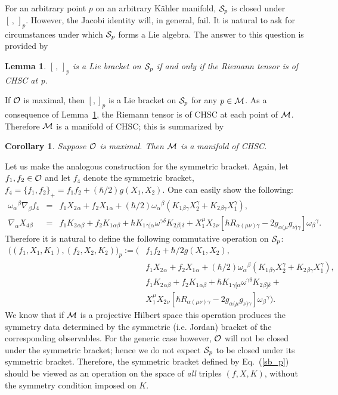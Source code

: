 \documentclass[12pt,aps,eqsecnum,tighten,nofootinbib]{revtex4-2}
\newtheorem{lemma}{Lemma}[section]
\def\be{\begin{equation}}
\def\ee{\end{equation}}
\def\ba{\begin{eqnarray}}
\def\ea{\end{eqnarray}}
\def\a{\alpha}
\def\b{\beta}
\def\c{\gamma}
\def\grad{\nabla}
\def\M{{\cal M}}
\def\w{\omega}
\newcommand{\eqn}[1]{Eq.~(\ref{#1})}
\newtheorem{cor}{Corollary}
\begin{document}
For an arbitrary point $p$ on an arbitrary K\"ahler manifold, ${\cal
S}_p$ is closed under $[\, ,\,]_p$.  However, the Jacobi identity
will, in general, fail.  It is natural to ask for circumstances under
which ${\cal S}_p$ forms a Lie algebra.  The answer to this question
is provided by
%
\begin{lemma} \label{lem_jacobi} 
$[\, ,\, ]_p$ is a Lie bracket on ${\cal S}_p$ if and only if the
Riemann tensor is of CHSC at p.
\end{lemma}
%
\noindent
If ${\cal O}$ is maximal, then $[ , ]_p$ is a Lie bracket on ${\cal
S}_p$ for any $p\in\M$.  As a consequence of Lemma~\ref{lem_jacobi},
the Riemann tensor is of CHSC at each point of $\M$.  Therefore $\M$
is a manifold of CHSC; this is summarized by
%
\begin{cor}\label{cor2}
Suppose ${\cal O}$ is maximal.  Then $\M$ is a manifold of CHSC.
\end{cor}
%

Let us make the analogous construction for the symmetric bracket.
Again, let $f_1, f_2 \in {\cal O}$ and let $f_4$ denote the symmetric
bracket, $f_4 = \{f_1, f_2 \}_+ = f_1 f_2 + (\hbar/2) g(X_1, X_2)$. 
One can easily show the following:
%
\ba
	\w_\a{}^\b \grad_\b f_4 &=&
	f_1 X_2{}_\a + f_2 X_1{}_\a + 
	(\hbar/2) \w_\a{}^\b\left(
	K_1{}_{\b\c} X_2^\c + K_2{}_{\b\c} X_1^\c \right),\\
%
	\grad_\a X_4{}_\b &=& 
	f_1 K_2{}_{\a\b} + f_2 K_1{}_{\a\b} +
	\hbar K_1{}_{\c[\a} \w^{\c\delta} K_2{}_{\b]\delta} +
	X_1^\mu X_2{}_\nu\left[
	\hbar R_{\a(\mu\nu)\c} - 2 g_{\a(\mu} g_{\nu)\c}
	\right] \w_\b{}^\c.
\ea
%
Therefore it is natural to define the following commutative operation
on ${\cal S}_p$:
%
\be\label{sb_p}
\begin{array}{ll}
	\big((f_1, X_1, K_1), (f_2, X_2, K_2) \big)_p :=
\bigg( &

	f_1 f_2 + \hbar/2 g( X_1, X_2 ), \\
&	f_1 X_2{}_\a + f_2 X_1{}_\a + 
	(\hbar/2) \w_\a{}^\b\left(
	K_1{}_{\b\c} X_2^\c + K_2{}_{\b\c} X_1^\c \right),\\
&	f_1 K_2{}_{\a\b} + f_2 K_1{}_{\a\b} +
	\hbar K_1{}_{\c[\a} \w^{\c\delta} K_2{}_{\b]\delta}+ \\
&       X_1^\mu X_2{}_\nu  \left[
	\hbar R_{\a(\mu\nu)\c} - 2 g_{\a(\mu} g_{\nu)\c}
		\right] \w_\b{}^\c  \bigg).
\end{array}
\ee
%
We know that if ${\cal M}$ is a projective Hilbert space this
operation produces the symmetry data determined by the symmetric
(i.e. Jordan) bracket of the corresponding observables.  For the
generic case however, ${\cal O}$ will not be closed under the
symmetric bracket; hence we do not expect ${\cal S}_p$ to be closed
under its symmetric bracket.  Therefore, the symmetric bracket defined
by \eqn{sb_p} should be viewed as an operation on the space of {\em
all} triples $(f, X, K)$, without the symmetry condition imposed on
$K$.
\end{document}
